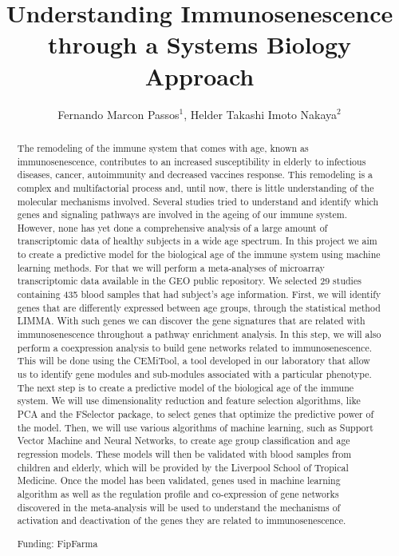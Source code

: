 \documentclass[twoside]{article}
\title{\vspace{-15mm}\fontsize{24pt}{10pt}\selectfont\textbf{Understanding Immunosenescence through a Systems Biology Approach}} %
\author{Fernando Marcon Passos$^1$, Helder Takashi Imoto Nakaya$^2$}
\affil{1 USP\\ }
\date{}
\begin{document}
\maketitle %

\thispagestyle{fancy} %


\begin{abstract}
The remodeling of the immune system that comes with age, known as immunosenescence, contributes to an increased susceptibility in elderly to infectious diseases, cancer, autoimmunity and decreased vaccines response. This remodeling is a complex and multifactorial process and, until now, there is little understanding of the molecular mechanisms involved. Several studies tried to understand and identify which genes and signaling pathways are involved in the ageing of our immune system. However, none has yet done a comprehensive analysis of a large amount of transcriptomic data of healthy subjects in a wide age spectrum.
In this project we aim to create a predictive model for the biological age of the immune system using machine learning methods. For that we will perform a meta-analyses of microarray transcriptomic data available in the GEO public repository. We selected 29 studies containing 435 blood samples that had subject's age information.
First, we will identify genes that are differently expressed between age groups, through the statistical method LIMMA. With such genes we can discover the gene signatures that are related with immunosenescence throughout a pathway enrichment analysis. In this step, we will also perform a coexpression analysis to build gene networks related to immunosenescence. This will be done using the CEMiTool, a tool developed in our laboratory that allow us to identify gene modules and sub-modules associated with a particular phenotype.
The next step is to create a predictive model of the biological age of the immune system. We will use dimensionality reduction and feature selection algorithms, like PCA and the FSelector package, to select genes that optimize the predictive power of the model. Then, we will use various algorithms of machine learning, such as Support Vector Machine and Neural Networks, to create age group classification and age regression models. These models will then be validated with blood samples from children and elderly, which will be provided by the Liverpool School of Tropical Medicine.
Once the model has been validated, genes used in machine learning algorithm as well as the regulation profile and co-expression of gene networks discovered in the meta-analysis will be used to understand the mechanisms of activation and deactivation of the genes they are related to immunosenescence.

Funding: FipFarma
\end{abstract}
\end{document}
